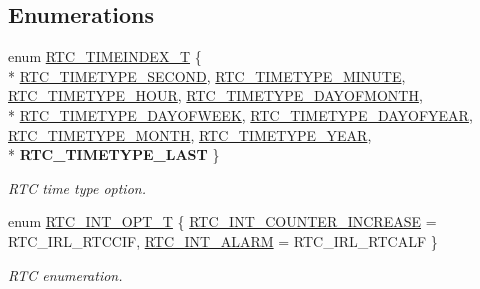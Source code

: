 \subsection*{Enumerations}
\begin{DoxyCompactItemize}
\item 
enum \hyperlink{group___r_t_c__17_x_x__40_x_x_ga8144898fe628404d396db06dc8aac0e0}{R\+T\+C\+\_\+\+T\+I\+M\+E\+I\+N\+D\+E\+X\+\_\+\+T} \{ \\*
\hyperlink{group___r_t_c__17_x_x__40_x_x_gga8144898fe628404d396db06dc8aac0e0ac0bdc1ff011be37cfeecb77c241e7fb8}{R\+T\+C\+\_\+\+T\+I\+M\+E\+T\+Y\+P\+E\+\_\+\+S\+E\+C\+O\+N\+D}, 
\hyperlink{group___r_t_c__17_x_x__40_x_x_gga8144898fe628404d396db06dc8aac0e0a11974e5996bfe6fbf0381d7ef3836964}{R\+T\+C\+\_\+\+T\+I\+M\+E\+T\+Y\+P\+E\+\_\+\+M\+I\+N\+U\+T\+E}, 
\hyperlink{group___r_t_c__17_x_x__40_x_x_gga8144898fe628404d396db06dc8aac0e0a4e88c263358395fecc19306556addacc}{R\+T\+C\+\_\+\+T\+I\+M\+E\+T\+Y\+P\+E\+\_\+\+H\+O\+U\+R}, 
\hyperlink{group___r_t_c__17_x_x__40_x_x_gga8144898fe628404d396db06dc8aac0e0a3cc8b55755f86e8a6a1a870a79122324}{R\+T\+C\+\_\+\+T\+I\+M\+E\+T\+Y\+P\+E\+\_\+\+D\+A\+Y\+O\+F\+M\+O\+N\+T\+H}, 
\\*
\hyperlink{group___r_t_c__17_x_x__40_x_x_gga8144898fe628404d396db06dc8aac0e0a88f328753d58927fafd45b35e0815e80}{R\+T\+C\+\_\+\+T\+I\+M\+E\+T\+Y\+P\+E\+\_\+\+D\+A\+Y\+O\+F\+W\+E\+E\+K}, 
\hyperlink{group___r_t_c__17_x_x__40_x_x_gga8144898fe628404d396db06dc8aac0e0ad05ce02297b482d4fa5b6a491ff04aff}{R\+T\+C\+\_\+\+T\+I\+M\+E\+T\+Y\+P\+E\+\_\+\+D\+A\+Y\+O\+F\+Y\+E\+A\+R}, 
\hyperlink{group___r_t_c__17_x_x__40_x_x_gga8144898fe628404d396db06dc8aac0e0a45d2078908fb25a714cbd01766f55fae}{R\+T\+C\+\_\+\+T\+I\+M\+E\+T\+Y\+P\+E\+\_\+\+M\+O\+N\+T\+H}, 
\hyperlink{group___r_t_c__17_x_x__40_x_x_gga8144898fe628404d396db06dc8aac0e0a780e93b1c505ed02ed139894566fcfe0}{R\+T\+C\+\_\+\+T\+I\+M\+E\+T\+Y\+P\+E\+\_\+\+Y\+E\+A\+R}, 
\\*
{\bfseries R\+T\+C\+\_\+\+T\+I\+M\+E\+T\+Y\+P\+E\+\_\+\+L\+A\+S\+T}
 \}
\begin{DoxyCompactList}\small\item\em R\+T\+C time type option. \end{DoxyCompactList}\item 
enum \hyperlink{group___r_t_c__17_x_x__40_x_x_gacbb4f3e21ac0f90878c95afe11f49161}{R\+T\+C\+\_\+\+I\+N\+T\+\_\+\+O\+P\+T\+\_\+\+T} \{ \hyperlink{group___r_t_c__17_x_x__40_x_x_ggacbb4f3e21ac0f90878c95afe11f49161a1545f38fd2671cb7521a77e7da3bde4d}{R\+T\+C\+\_\+\+I\+N\+T\+\_\+\+C\+O\+U\+N\+T\+E\+R\+\_\+\+I\+N\+C\+R\+E\+A\+S\+E} = R\+T\+C\+\_\+\+I\+R\+L\+\_\+\+R\+T\+C\+C\+I\+F, 
\hyperlink{group___r_t_c__17_x_x__40_x_x_ggacbb4f3e21ac0f90878c95afe11f49161adec1af649886bf5a419d636276ca54a5}{R\+T\+C\+\_\+\+I\+N\+T\+\_\+\+A\+L\+A\+R\+M} = R\+T\+C\+\_\+\+I\+R\+L\+\_\+\+R\+T\+C\+A\+L\+F
 \}
\begin{DoxyCompactList}\small\item\em R\+T\+C enumeration. \end{DoxyCompactList}\end{DoxyCompactItemize}
